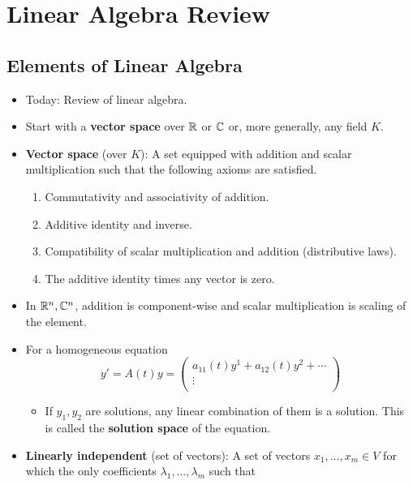 \documentclass[../notes.tex]{subfiles}
\begin{document}
\chapter{Linear Algebra Review}
\section{Elements of Linear Algebra}
\begin{itemize}
    \item {}Today: Review of linear algebra.
    \item Start with a \textbf{vector space} over $\mathbb{R}$ or $\mathbb{C}$ or, more generally, any field $K$.
    \item \textbf{Vector space} (over $K$): A set equipped with addition and scalar multiplication such that the following axioms are satisfied.
    \begin{enumerate}
        \item Commutativity and associativity of addition.
        \item Additive identity and inverse.
        \item Compatibility of scalar multiplication and addition (distributive laws).
        \item The additive identity times any vector is zero.
    \end{enumerate}
    \item In $\mathbb{R}^n,\mathbb{C}^n$, addition is component-wise and scalar multiplication is scaling of the element.
    \item For a homogeneous equation
    \begin{equation*}
        y' = A(t)y
        =
        \begin{pmatrix}
            a_{11}(t)y^1+a_{12}(t)y^2+\cdots\\
            \vdots\\
        \end{pmatrix}
    \end{equation*}
    \begin{itemize}
        \item If $y_1,y_2$ are solutions, any linear combination of them is a solution. This is called the \textbf{solution space} of the equation.
    \end{itemize}
    \item \textbf{Linearly independent} (set of vectors): A set of vectors $x_1,\dots,x_m\in V$ for which the only coefficients $\lambda_1,\dots,\lambda_m$ such that
    \begin{equation*}

\end{equation*}
\end{itemize}
\end{document}
